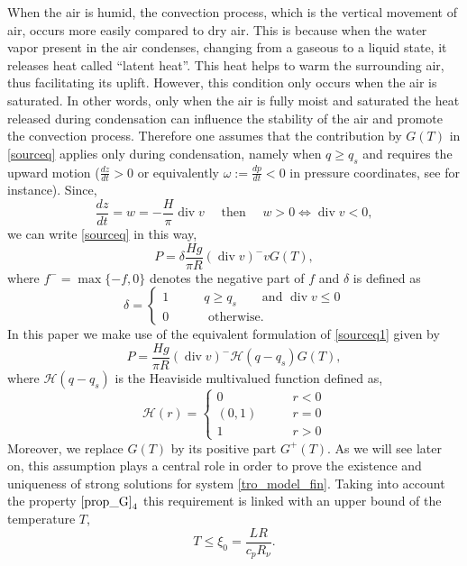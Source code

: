 \documentclass[11pt, a4paper, article,reqno,]{amsart}
\theoremstyle{remark}
\DeclareMathOperator{\dive}{div}
\numberwithin{equation}{section}
\begin{document}
When the air is humid, the convection process, which is the vertical movement of air, occurs more easily compared to dry air. This is because when the water vapor present in the air condenses, changing from a gaseous to a liquid state, it releases heat called ``latent heat''. This heat helps to warm the surrounding air, thus facilitating its uplift. However, this condition only occurs when the air is saturated. In other words, only when the air is fully moist and saturated the heat released during condensation can influence the stability of the air and promote the convection process. Therefore one assumes that the contribution by $G(T)$ in \eqref{sourceq} applies only during condensation, namely when $q \geq q_s$ and requires the upward motion ($\frac{dz}{dt}> 0$ or equivalently $\omega := \frac{dp}{dt}<0$ in pressure coordinates, see \cite{CZ} for instance). Since,
\begin{equation*}
    \frac{dz}{dt} = w = -\frac{H}{\pi} \dive v \quad \text{ then } \quad w> 0 \Longleftrightarrow \dive v < 0,
\end{equation*}
we can write \eqref{sourceq} in this way,
\begin{equation}\label{sourceq1}
   P = \delta \frac{Hg}{\pi R}(\dive v)^{-} vG(T),
\end{equation}
where $f^-=\max \{-f,0 \}$ denotes the negative part of $f$ and $\delta$ is defined as
\begin{equation*}
        \delta = \left \{ \begin{aligned} 
         1 \qquad & q \geq q_s \qquad \text{and } \dive v \leq 0\\
        0 \qquad & \text{ otherwise. }
        \end{aligned}\right.
    \end{equation*}
In this paper we make use of the equivalent formulation of \eqref{sourceq1} given by 
\begin{equation}\label{sourceq2}
    P = \frac{Hg}{\pi R}(\dive v)^{-} \mathcal{H}(q-q_s) G(T),
\end{equation}
where $\mathcal{H}(q-q_s)$ is the Heaviside multivalued function defined as,
\begin{equation}\label{heaviside}
        \mathcal{H}(r) = \left \{ \begin{aligned} 
         0 \qquad & r<0 \\
        (0,1) \qquad & r=0 \\
        1 \qquad &r>0
        \end{aligned}\right.
    \end{equation}
Moreover, we replace $G(T)$ by its positive part $G^+(T)$. As we will see later on, this assumption plays a central role in order to prove the existence and uniqueness of strong solutions for system \eqref{tro_model_fin}. Taking into account  the property $\eqref{prop_G}_{4}$ this requirement is linked with an upper bound of the temperature $T$,
\begin{equation}
\label{bound T}
T\leq \xi_0 = \frac {LR}{c_pR_\nu}.
\end{equation}
\end{document}
